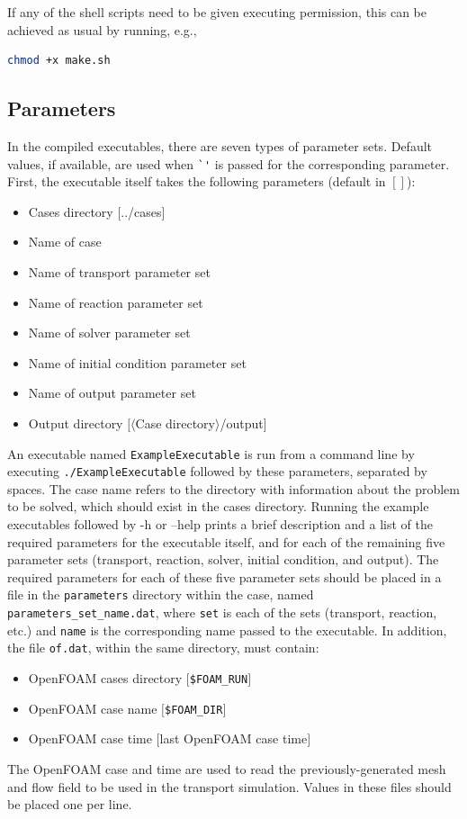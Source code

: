 \documentclass[11pt]{article}
\begin{document}
If any of the shell scripts need to be given executing permission, this can be achieved as usual by running, e.g.,
%
\begin{lstlisting}[language=bash]
  chmod +x make.sh
\end{lstlisting}

\subsection{Parameters}

In the compiled executables, there are seven types of parameter sets. Default values, if available, are used when \lstinline{`'} is passed for the corresponding parameter. First, the executable itself takes the following parameters (default in $[]$):
%
\begin{itemize}
\item Cases directory $[$../cases$]$
\item Name of case
\item Name of transport parameter set
\item Name of reaction parameter set
\item Name of solver parameter set
\item Name of initial condition parameter set
\item Name of output parameter set
\item Output directory $[\langle$Case directory$\rangle$/output]
\end{itemize}
An executable named \lstinline{ExampleExecutable} is run from a command line by executing \lstinline{./ExampleExecutable} followed by these parameters, separated by spaces. The case name refers to the directory with information about the problem to be solved, which should exist in the cases directory. Running the example executables followed by -h or --help prints a brief description and a list of the required parameters for the executable itself, and for each of the remaining five parameter sets (transport, reaction, solver, initial condition, and output). The required parameters for each of these five parameter sets should be placed in a file in the \lstinline{parameters} directory within the case, named \lstinline{parameters_set_name.dat}, where \lstinline{set} is each of the sets (transport, reaction, etc.) and \lstinline{name} is the corresponding name passed to the executable. In addition, the file \lstinline{of.dat}, within the same directory, must contain:
%
\begin{itemize}
\item OpenFOAM cases directory $[$\lstinline{$FOAM_RUN}$]$
\item OpenFOAM case name $[$\lstinline{$FOAM_DIR}$]$
\item OpenFOAM case time $[$last OpenFOAM case time$]$
\end{itemize}
The OpenFOAM case and time are used to read the previously-generated mesh and flow field to be used in the transport simulation. Values in these files should be placed one per line.
\end{document}
